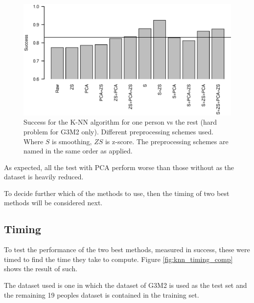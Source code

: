\begin{figure}[H]
\includegraphics[width = 0.95 \textwidth]{graphics/knn_zscore_3}
\caption{Success for the K-NN algorithm for one person vs the rest (hard problem for G3M2 only). Different preprocessing schemes used.
Where $S$ is smoothing, $ZS$ is z-score.
The preprocessing schemes are named in the same order as applied.}
\label{fig:knn_zscore_3}
\end{figure}


As expected, all the test with PCA perform worse than those without as the dataset is heavily reduced.

To decide further which of the methods to use, then the timing of two best methods will be considered next.
%


\subsection{Timing}

To test the performance of the two best methods, measured in success, these were timed to find the time they take to compute.
Figure \ref{fig:knn_timing_comp} shows the result of such.

The dataset used is one in which the dataset of G3M2 is used as the test set and the remaining 19 peoples dataset is contained in the training set.


